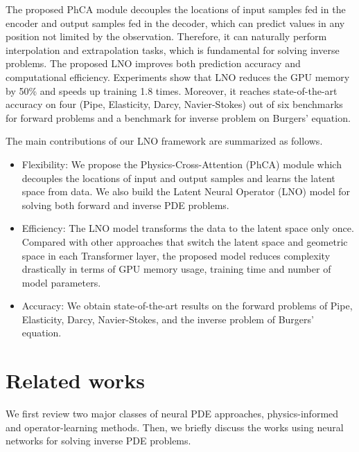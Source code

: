 \documentclass{article}
\begin{document}
The proposed PhCA module decouples the locations of input samples fed in the encoder and output samples fed in the decoder, which can predict values in any position not limited by the observation. Therefore, it can naturally perform interpolation and extrapolation tasks, which is fundamental for solving inverse problems.
The proposed LNO improves both prediction accuracy and computational efficiency. Experiments show that LNO reduces the GPU memory by 50\% and speeds up training 1.8 times. Moreover, it reaches state-of-the-art accuracy on four (Pipe, Elasticity, Darcy, Navier-Stokes) out of six benchmarks for forward problems and a benchmark for inverse problem on Burgers' equation.

The main contributions of our LNO framework are summarized as follows. %
\begin{itemize}
\item Flexibility: We propose the Physics-Cross-Attention (PhCA) module which decouples the locations of input and output samples and learns the latent space from data. We also build the Latent Neural Operator (LNO) model for solving both forward and inverse PDE problems.
\item Efficiency: The LNO model transforms the data to the latent space only once. Compared with other approaches that switch the latent space and geometric space in each Transformer layer, the proposed model reduces complexity drastically in terms of GPU memory usage, training time and number of model parameters.
\item Accuracy: We obtain state-of-the-art results on the forward problems of Pipe, Elasticity, Darcy, Navier-Stokes, and the inverse problem of Burgers' equation.
\end{itemize}

\section{Related works}
We first review two major classes of neural PDE approaches, physics-informed and operator-learning methods. Then, we briefly discuss the works using neural networks for solving inverse PDE problems.
\end{document}
